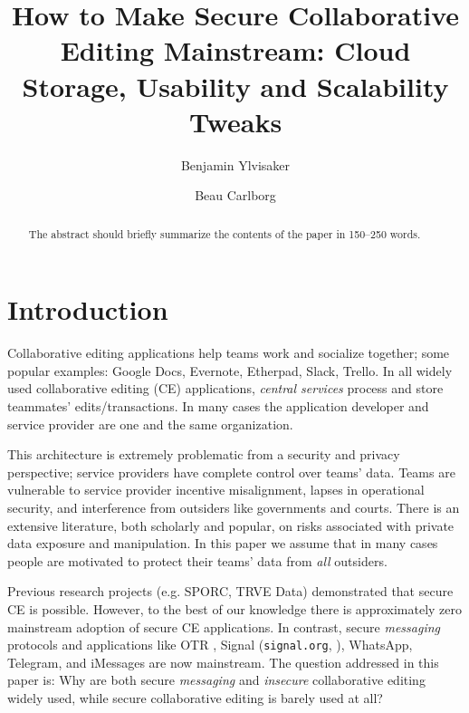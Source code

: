 \documentclass[runningheads]{llncs}
\begin{document}
\title{How to Make Secure Collaborative Editing Mainstream: Cloud Storage, Usability and Scalability Tweaks}

\author{Benjamin Ylvisaker \and
Beau Carlborg\orcidID{}}


\maketitle


\begin{abstract}
The abstract should briefly summarize the contents of the paper in
150--250 words.

\end{abstract}


\section{Introduction}

Collaborative editing applications help teams work and socialize together; some popular examples: Google Docs, Evernote, Etherpad, Slack, Trello.
In all widely used collaborative editing (CE) applications, \emph{central services} process and store teammates' edits/transactions.
In many cases the application developer and service provider are one and the same organization.

This architecture is extremely problematic from a security and privacy perspective; service providers have complete control over teams' data.
Teams are vulnerable to service provider incentive misalignment, lapses in operational security, and interference from outsiders like governments and courts.
There is an extensive literature, both scholarly and popular, on risks associated with private data exposure and manipulation.
In this paper we assume that in many cases people are motivated to protect their teams' data from \emph{all} outsiders.

Previous research projects (e.g. SPORC\cite{Feldman2010}, TRVE Data\cite{Kleppmann2018}) demonstrated that secure CE is possible.
However, to the best of our knowledge there is approximately zero mainstream adoption of secure CE applications.
In contrast, secure \emph{messaging} protocols and applications like OTR \cite{Borisov2004}, Signal (\texttt{signal.org}, \cite{Cohn-Gordon2018}), WhatsApp, Telegram, and iMessages \cite{TODO} are now mainstream.
The question addressed in this paper is: Why are both secure \emph{messaging} and \emph{insecure} collaborative editing widely used, while secure collaborative editing is barely used at all?\footnotemark{}
\end{document}
